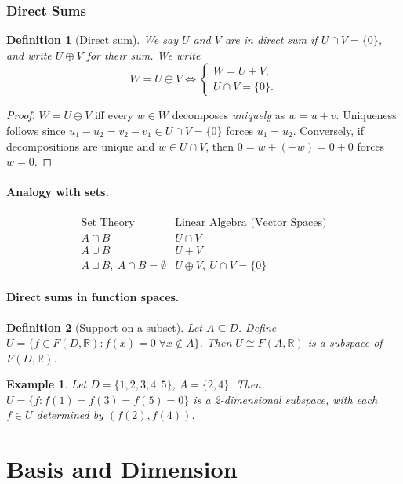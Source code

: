 \documentclass{article}
\newtheorem{definition}{Definition}
\newtheorem*{example}{Example}
\begin{document}
\subsubsection{Direct Sums}
\begin{definition}[Direct sum]
    We say $U$ and $V$ are in direct sum if $U\cap V = \{0\}$, and write $U\oplus V$ for their sum. We write
    \[W = U\oplus V \iff \begin{cases}W = U+V,\\ U\cap V = \{0\}.\end{cases}\]
\end{definition}
\begin{proof}
    $W=U\oplus V$ iff every $w\in W$ decomposes \emph{uniquely} as $w=u+v$. Uniqueness follows since $u_1-u_2 = v_2-v_1 \in U\cap V = \{0\}$ forces $u_1=u_2$. Conversely, if decompositions are unique and $w\in U\cap V$, then $0 = w+(-w) = 0+0$ forces $w=0$.
\end{proof}

\paragraph{Analogy with sets.}
\[\begin{array}{c|c}
\text{Set Theory} & \text{Linear Algebra (Vector Spaces)} \\
\hline
A \cap B & U \cap V \\
A \cup B & U + V \\
A \sqcup B,\ A \cap B = \emptyset & U \oplus V,\ U \cap V = \{0\}
\end{array}\]

\paragraph{Direct sums in function spaces.}
\begin{definition}[Support on a subset]
    Let $A \subseteq D$. Define $U = \{f \in F(D,\mathbb{R}) : f(x)=0\;\forall x\notin A\}$. Then $U \cong F(A,\mathbb{R})$ is a subspace of $F(D,\mathbb{R})$.
\end{definition}
\begin{example}
    Let $D=\{1,2,3,4,5\}$, $A=\{2,4\}$. Then $U = \{f : f(1)=f(3)=f(5)=0\}$ is a 2-dimensional subspace, with each $f\in U$ determined by $(f(2),f(4))$.
\end{example}

\section{Basis and Dimension}
\end{document}
